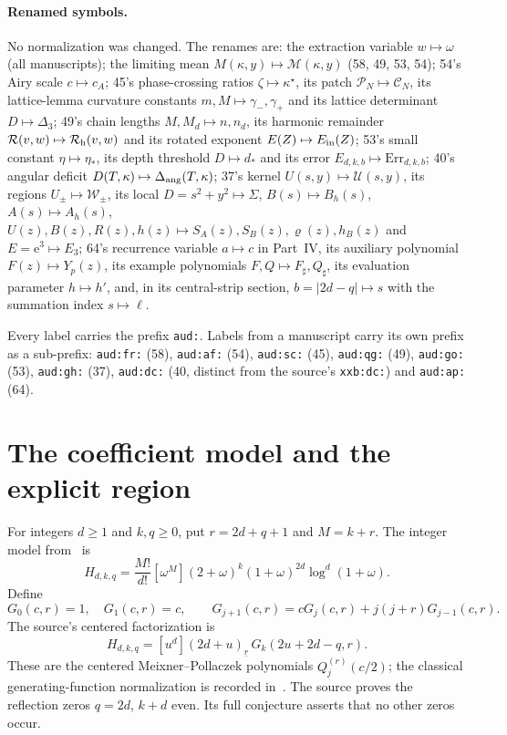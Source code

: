 \documentclass[11pt,a4paper]{article}
\numberwithin{equation}{section}
\newcommand{\fall}[2]{(#1)_{\underline{#2}}}
\begin{document}
\paragraph{Renamed symbols.}
No normalization was changed. The renames are: the extraction variable $w\mapsto\omega$ (all manuscripts); the limiting mean $M(\kappa,y)\mapsto\mathcal M(\kappa,y)$ (58, 49, 53, 54); 54's Airy scale $c\mapsto c_A$; 45's phase-crossing ratios $\zeta\mapsto\kappa^\star$, its patch $\mathcal P_N\mapsto\mathcal C_N$, its lattice-lemma curvature constants $m,M\mapsto\gamma_-,\gamma_+$ and its lattice determinant $D\mapsto\Delta_3$; 49's chain lengths $M,M_d\mapsto n,n_d$, its harmonic remainder $\mathcal R(v,w)\mapsto\mathcal R_{\rm h}(v,w)$ and its rotated exponent $E(Z)\mapsto E_{\rm in}(Z)$; 53's small constant $\eta\mapsto\eta_*$, its depth threshold $D\mapsto d_*$ and its error $E_{d,k,b}\mapsto\mathrm{Err}_{d,k,b}$; 40's angular deficit $D(T,\kappa)\mapsto\Delta_{\rm ang}(T,\kappa)$; 37's kernel $U(s,y)\mapsto\mathcal U(s,y)$, its regions $U_\pm\mapsto\mathcal W_\pm$, its local $D=s^2+y^2\mapsto\Sigma$, $B(s)\mapsto B_h(s)$, $A(s)\mapsto A_h(s)$, $U(z),B(z),R(z),h(z)\mapsto S_A(z),S_B(z),\varrho(z),h_B(z)$ and $E=\mathrm e^3\mapsto E_3$; 64's recurrence variable $a\mapsto c$ in Part~IV, its auxiliary polynomial $F(z)\mapsto Y_p(z)$, its example polynomials $F,Q\mapsto F_\sharp,Q_\sharp$, its evaluation parameter $h\mapsto h'$, and, in its central-strip section, $b=|2d-q|\mapsto s$ with the summation index $s\mapsto\ell$.

Every label carries the prefix \texttt{aud:}. Labels from a manuscript carry its own prefix as a sub-prefix: \texttt{aud:fr:} (58), \texttt{aud:af:} (54), \texttt{aud:sc:} (45), \texttt{aud:qg:} (49), \texttt{aud:go:} (53), \texttt{aud:gh:} (37), \texttt{aud:dc:} (40, distinct from the source's \texttt{xxb:dc:}) and \texttt{aud:ap:} (64).

\section{The coefficient model and the explicit region}\label{aud:sec:model}
For integers $d\ge1$ and $k,q\ge0$, put $r=2d+q+1$ and $M=k+r$. The integer model from~\cite[Section 3.15]{source} is
\begin{equation}\label{aud:fr:H}
 H_{d,k,q}=\frac{M!}{d!}[\omega^M](2+\omega)^k(1+\omega)^{2d}\log^d(1+\omega).
\end{equation}
Define
\begin{equation}\label{aud:fr:G}
 G_0(c,r)=1,\quad G_1(c,r)=c,\qquad
 G_{j+1}(c,r)=cG_j(c,r)+j(j+r)G_{j-1}(c,r).
\end{equation}
The source's centered factorization is
\begin{equation}\label{aud:fr:factor}
 H_{d,k,q}=[u^d]\fall{2d+u}{r}\,G_k(2u+2d-q,r).
\end{equation}
These are the centered Meixner--Pollaczek polynomials $Q_j^{(r)}(c/2)$; the classical generating-function normalization is recorded in~\cite{dlmf}. The source proves the reflection zeros $q=2d$, $k+d$ even. Its full conjecture asserts that no other zeros occur.
\end{document}
